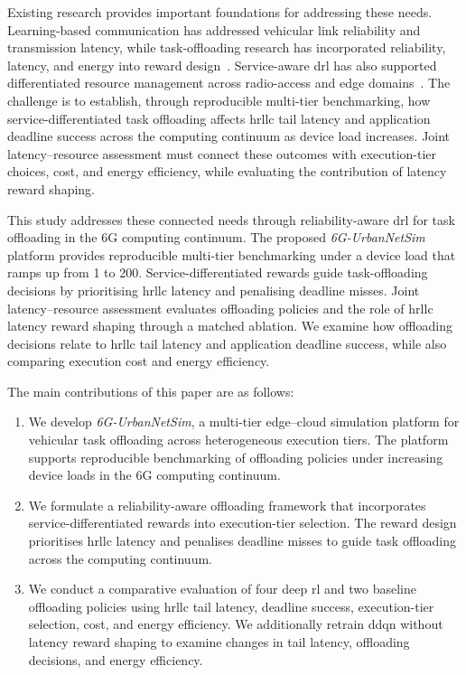 \documentclass[journal]{IEEEtran}
\begin{document}
Existing research provides important foundations for addressing these needs. Learning-based communication has addressed vehicular link reliability and transmission latency, while task-offloading research has incorporated reliability, latency, and energy into reward design~\cite{RW01,RW08}.
Service-aware \ac{drl} has also supported differentiated resource management across radio-access and edge domains~\cite{RW09}.
The challenge is to establish, through reproducible multi-tier benchmarking, how service-differentiated task offloading affects \ac{hrllc} tail latency and application deadline success across the computing continuum as device load increases.
Joint latency--resource assessment must connect these outcomes with execution-tier choices, cost, and energy efficiency, while evaluating the contribution of latency reward shaping.

This study addresses these connected needs through reliability-aware \ac{drl} for task offloading in the 6G computing continuum.
The proposed \textit{6G-UrbanNetSim} platform provides reproducible multi-tier benchmarking under a device load that ramps up from 1 to 200. Service-differentiated rewards guide task-offloading decisions by prioritising \ac{hrllc} latency and penalising deadline misses. Joint latency--resource assessment evaluates offloading policies and the role of \ac{hrllc} latency reward shaping through a matched ablation. We examine how offloading decisions relate to \ac{hrllc} tail latency and application deadline success, while also comparing execution cost and energy efficiency.

The main contributions of this paper are as follows:
\begin{enumerate}
  \item We develop \textit{6G-UrbanNetSim}, a multi-tier edge--cloud simulation platform for vehicular task offloading across heterogeneous execution tiers.
  The platform supports reproducible benchmarking of offloading policies under increasing device loads in the 6G computing continuum.
  \item We formulate a reliability-aware offloading framework that incorporates service-differentiated rewards into execution-tier selection.
  The reward design prioritises \ac{hrllc} latency and penalises deadline misses to guide task offloading across the computing continuum.
  \item We conduct a comparative evaluation of four deep \ac{rl} and two baseline offloading policies using \ac{hrllc} tail latency, deadline success, execution-tier selection, cost, and energy efficiency.
  We additionally retrain \ac{ddqn} without latency reward shaping to examine changes in tail latency, offloading decisions, and energy efficiency.
\end{enumerate}
\end{document}
